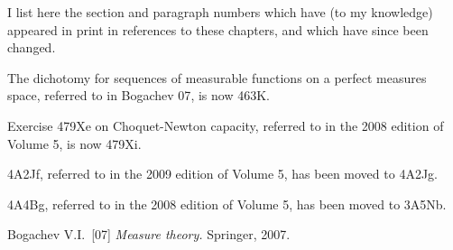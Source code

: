      
\gdef\topparagraph{}
\gdef\bottomparagraph{}
\gdef\newparagraph{}
     
\def\chaptername{Concordance}
\def\sectionname{Concordance}
\let\headlinesectionname=\sectionname

     
     
\medskip
     
I list here the section and paragraph numbers which have 
(to my knowledge) appeared in print in references to these chapters,
and which have since been changed.
     
\bigskip
     
 The dichotomy for sequences of
measurable functions on a perfect measures space, 
referred to in {\smc Bogachev 07}, is now 463K.

 Exercise 4{}79Xe on Choquet-Newton capacity, referred to
in the 2008 edition of Volume 5, is now 479Xi.

 4{}A2Jf,
referred to in the 2009 edition of Volume 5, has been moved to 4A2Jg.

 4{}A4Bg,
referred to in the 2008 edition of Volume 5, has been moved to 3A5Nb.

\bigskip


\medskip
     
Bogachev V.I.\ [07] {\it Measure theory.}  Springer, 2007.

\frnewpage
     
